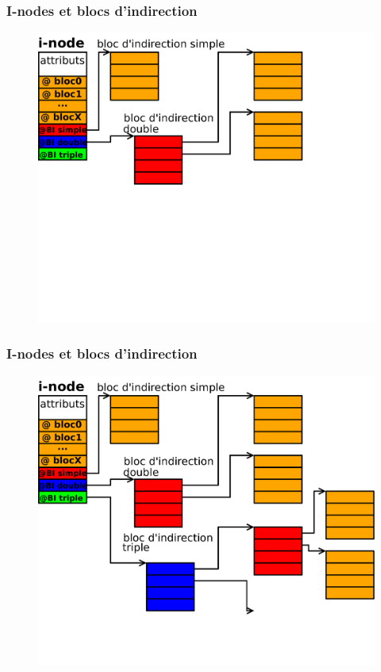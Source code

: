 \begin{frame}
  \frametitle{I-nodes et blocs d'indirection}
  \begin{figure}
    \includegraphics[width=0.9\linewidth]{fig4/inode3}
  \end{figure}
\end{frame}
\begin{frame}
  \frametitle{I-nodes et blocs d'indirection}
  \begin{figure}
    \includegraphics[width=0.9\linewidth]{fig4/inode}
  \end{figure}
\end{frame}

